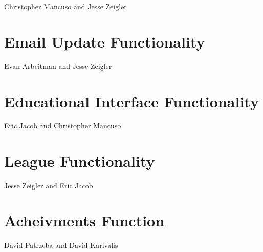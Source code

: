 \documentclass[11pt,letterpaper,oneside]{memoir}
\begin{document}
Christopher Mancuso and Jesse Zeigler

\section{Email Update Functionality}

Evan Arbeitman and Jesse Zeigler

\section{Educational Interface Functionality}

Eric Jacob and Christopher Mancuso

\section{League Functionality}

Jesse Zeigler and Eric Jacob

\section{Acheivments Function}

David Patrzeba and David Karivalis
\end{document}
